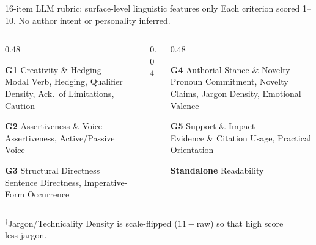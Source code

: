 \documentclass[aspectratio=169,11pt]{beamer}
\begin{document}
\begin{frame}{16-item LLM rubric: surface-level linguistic features only}
    \vspace{0.1cm}
    {\normalsize\color{WarmGray} Each criterion scored 1--10. No author intent or personality inferred.}
    \vspace{0.3cm}

    \begin{columns}[T, onlytextwidth]

        \begin{column}{0.48\textwidth}
            \RaggedRight
            {\normalsize
            \textbf{\color{Teal} G1} Creativity \& Hedging\\[0.05cm]
            {\small\color{WarmGray} Modal Verb, Hedging, Qualifier Density, Ack.\ of Limitations, Caution}
            \vspace{0.25cm}

            \textbf{\color{WarmOrange} G2} Assertiveness \& Voice\\[0.05cm]
            {\small\color{WarmGray} Assertiveness, Active/Passive Voice}
            \vspace{0.25cm}

            \textbf{\color{SoftPurple} G3} Structural Directness\\[0.05cm]
            {\small\color{WarmGray} Sentence Directness, Imperative-Form Occurrence}
            }
        \end{column}

        \begin{column}{0.04\textwidth}\end{column}

        \begin{column}{0.48\textwidth}
            \RaggedRight
            {\normalsize
            \textbf{\color{Gold} G4} Authorial Stance \& Novelty\\[0.05cm]
            {\small\color{WarmGray} Pronoun Commitment, Novelty Claims, Jargon Density, Emotional Valence}
            \vspace{0.25cm}

            \textbf{\color{DeepRed} G5} Support \& Impact\\[0.05cm]
            {\small\color{WarmGray} Evidence \& Citation Usage, Practical Orientation}
            \vspace{0.25cm}

            \textbf{\color{WarmGray} Standalone} Readability
            }
        \end{column}

    \end{columns}
    \vspace{0.3cm}
    {\small\color{WarmGray} $^{\dagger}$Jargon/Technicality Density is scale-flipped ($11-$raw) so that high score $=$ less jargon.}
\end{frame}
\end{document}
